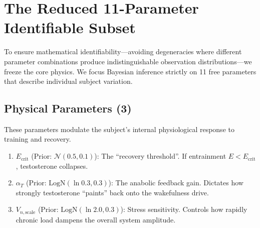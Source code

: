 \documentclass[11pt,a4paper]{article}
\begin{document}
\section{The Reduced 11-Parameter Identifiable Subset}

To ensure mathematical identifiability—avoiding degeneracies where different parameter combinations produce indistinguishable observation distributions—we freeze the core physics. We focus Bayesian inference strictly on 11 free parameters that describe individual subject variation. 

\subsection{Physical Parameters (3)}
These parameters modulate the subject's internal physiological response to training and recovery.
\begin{enumerate}
    \item $E_{\text{crit}}$ (Prior: $\mathcal{N}(0.5, 0.1)$): The ``recovery threshold''. If entrainment $E < E_{\text{crit}}$, testosterone collapses.
    \item $\alpha_T$ (Prior: $\text{LogN}(\ln 0.3, 0.3)$): The anabolic feedback gain. Dictates how strongly testosterone ``paints'' back onto the wakefulness drive.
    \item $V_{n,\text{scale}}$ (Prior: $\text{LogN}(\ln 2.0, 0.3)$): Stress sensitivity. Controls how rapidly chronic load dampens the overall system amplitude.
\end{enumerate}
\end{document}
